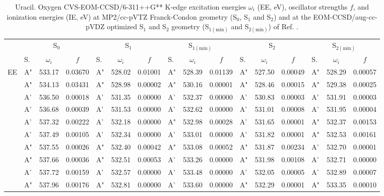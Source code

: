 \documentclass[journal=jctcce,manuscript=article]{achemso}
\begin{document}
\begin{table}
\caption{Uracil.  Oxygen CVS-EOM-CCSD/6-311++G** K-edge excitation energies $\omega_i$ (EE, eV), oscillator strengths $f$, and ionization energies (IE, eV) at MP2/cc-pVTZ Franck-Condon geometry (S$_0$, S$_1$ and S$_2$) and at the EOM-CCSD/aug-cc-pVDZ optimized S$_1$ and S$_2$ geometry (S$_{1(\text{min})}$ and S$_{2(\text{min})}$) of Ref. .
\label{Tab:Uracil:CCSD:Oxygen}}
\scriptsize
\begin{tabular}{l|lcc|lcc|lcc|lcc|lcc}
\cline{2-16}
& \multicolumn{3}{c|}{S$_0$}
& \multicolumn{3}{c|}{S$_1$}  
& \multicolumn{3}{c|}{S$_{1(\text{min})}$}
& \multicolumn{3}{c|}{S$_2$}
& \multicolumn{3}{c}{S$_{2(\text{min})}$}
\\
\cline{2-16}
& S. & $\omega_i$ & $f$ 
& S. & $\omega_i$ & $f$ 
& S. & $\omega_i$ & $f$ 
& S. & $\omega_i$ & $f$ 
& S. & $\omega_i$ & $f$\\
\hline
  EE 
 &  A"  &  533.17  &  0.03670 & A" & 528.02 & 0.01001 & A" & 528.39 & 0.01139 & A" & 527.50 & 0.00049 & A" & 528.29 & 0.00057 \\ 
 &  A"  &  534.13  &  0.03431 & A" & 528.98 & 0.00002 & A" & 530.16 & 0.00001 & A" & 528.46 & 0.00015 & A" & 529.38 & 0.00025 \\ 
 &  A'  &  536.50  &  0.00018 & A' & 531.35 & 0.00000 & A' & 532.37 & 0.00000 & A' & 530.83 & 0.00003 & A' & 531.91 & 0.00003 \\ 
 &  A'  &  536.68  &  0.00039 & A' & 531.53 & 0.00000 & A' & 532.62 & 0.00000 & A' & 531.01 & 0.00008 & A' & 531.95 & 0.00004 \\ 
 &  A'  &  537.32  &  0.00222 & A' & 532.18 & 0.00000 & A" & 532.98 & 0.00028 & A' & 531.65 & 0.00001 & A" & 532.37 & 0.00153 \\ 
 &  A'  &  537.49  &  0.00105 & A' & 532.34 & 0.00000 & A' & 533.01 & 0.00000 & A' & 531.82 & 0.00001 & A" & 532.53 & 0.00161 \\ 
 &  A"  &  537.55  &  0.00026 & A" & 532.40 & 0.00042 & A" & 533.08 & 0.00052 & A" & 531.87 & 0.00234 & A' & 532.70 & 0.00001 \\ 
 &  A"  &  537.66  &  0.00036 & A" & 532.51 & 0.00053 & A' & 533.26 & 0.00000 & A" & 531.98 & 0.00108 & A' & 532.71 & 0.00000 \\ 
 &  A'  &  537.72  &  0.00159 & A' & 532.57 & 0.00000 & A' & 533.48 & 0.00000 & A' & 532.05 & 0.00005 & A' & 532.89 & 0.00007 \\ 
 &  A"  &  537.96  &  0.00176 & A" & 532.81 & 0.00000 & A' & 533.60 & 0.00000 & A" & 532.29 & 0.00001 & A" & 533.35 & 0.00010 \\ 

\end{tabular}
\end{table}
\end{document}

